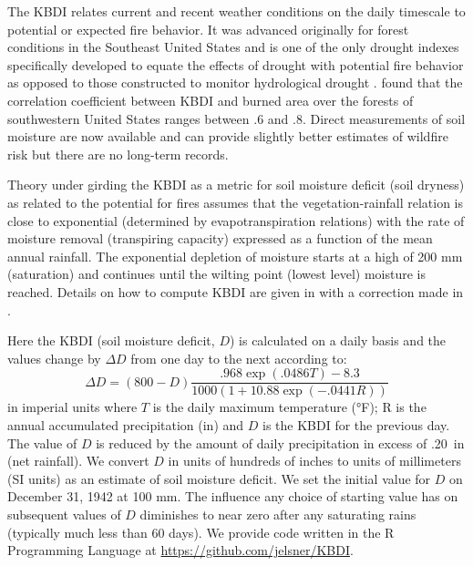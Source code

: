 \documentclass[12pt]{iopart}
\begin{document}
The KBDI relates current and recent weather conditions on the daily timescale to potential or expected fire behavior. It was advanced originally for forest conditions in the Southeast United States and is one of the only drought indexes specifically developed to equate the effects of drought with potential fire behavior \citep{JanisEtAl2002} as opposed to those constructed to monitor hydrological drought \citep{StahlEtAl2020}. \cite{AbatzoglouWilliams2016} found that the correlation coefficient between KBDI and burned area over the forests of southwestern United States ranges between .6 and .8. Direct measurements of soil moisture are now available and can provide slightly better estimates of wildfire risk \citep{KruegerEtAl2017} but there are no long-term records.

Theory under girding the KBDI as a metric for soil moisture deficit (soil dryness) as related to the potential for fires assumes that the vegetation-rainfall relation is close to exponential (determined by evapotranspiration relations) with the rate of moisture removal (transpiring capacity) expressed as a function of the mean annual rainfall. The exponential depletion of moisture starts at a high of 200 mm (saturation) and continues until the wilting point (lowest level) moisture is reached. Details on how to compute KBDI are given in \cite{KeetchByram1968} with a correction made in \cite{Alexander1992}.

Here the KBDI (soil moisture deficit, $D$) is calculated on a daily basis and the values change by $\Delta D$ from one day to the next according to:
\begin{equation}
    \Delta D = (800 - D)\frac{.968 \exp(.0486 T) - 8.3}{1000 \left(1 + 10.88 \exp(-.0441 R)\right)}
\end{equation}
in imperial units where $T$ is the daily maximum temperature (°F); R is the annual accumulated precipitation (in) and $D$ is the KBDI for the previous day. The value of $D$ is reduced by the amount of daily precipitation in excess of .20~in (net rainfall). We convert $D$ in units of hundreds of inches to units of millimeters (SI units) as an estimate of soil moisture deficit. We set the initial value for $D$ on December 31, 1942 at 100 mm. The influence any choice of starting value has on subsequent values of $D$ diminishes to near zero after any saturating rains (typically much less than 60 days). We provide code written in the R Programming Language \citep{RCoreTeam2022} at \url{https://github.com/jelsner/KBDI}.
\end{document}
